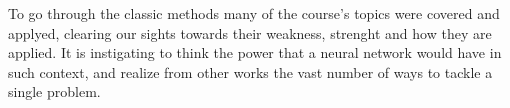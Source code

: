 \documentclass[10pt,twocolumn,letterpaper]{article}
\begin{document}
  To go through the classic methods many of the course's topics were covered and
  applyed, clearing our sights towards their weakness, strenght and how they are
  applied. It is instigating to think the power that a neural network would have
  in such context, and realize from other works the vast number of ways to
  tackle a single problem.

{\small


}
\end{document}
